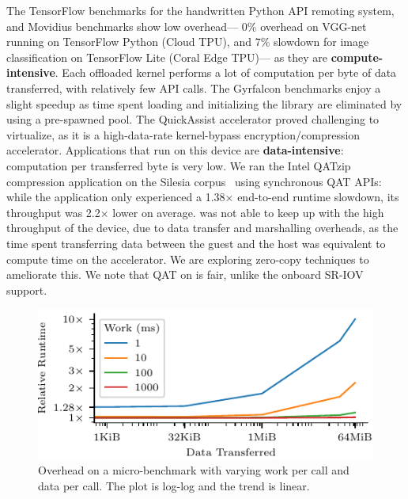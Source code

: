 The TensorFlow benchmarks for the handwritten Python API remoting system, and Movidius benchmarks show low overhead---%
0\% overhead on VGG-net running on TensorFlow Python (Cloud TPU), and 7\% slowdown for image classification on TensorFlow Lite (Coral Edge TPU)---%
as they are \textbf{compute-intensive}. Each offloaded kernel performs a lot of computation per byte of data transferred, with relatively few API calls.
The Gyrfalcon benchmarks enjoy a slight speedup as time spent loading and initializing the library are eliminated by using a pre-spawned \worker pool.
The QuickAssist accelerator proved challenging to virtualize, as it is a high-data-rate kernel-bypass encryption/compression accelerator.
Applications that run on this device are \textbf{data-intensive}: computation per transferred byte is very low.
We ran the Intel QATzip compression application on the Silesia corpus~\cite{silesia} using synchronous QAT APIs: while the application only experienced a 1.38$\times$ end-to-end runtime slowdown, its throughput was 2.2$\times$ lower on average.
\model was not able to keep up with the high throughput of the device, due to data transfer and marshalling overheads, as the time spent transferring data between the guest and the host was equivalent to compute time on the accelerator.
We are exploring zero-copy techniques to ameliorate this. We note that QAT on \model is fair, unlike the onboard SR-IOV support.



\label{s:micro_benchmark}

\begin{figure}
  \centering
	\includegraphics[width=\columnwidth]{ava/data/microbenchmark/overhead_plot.pdf}%
    \vspace*{-.5em}
	\caption{Overhead on a micro-benchmark with varying work per call and data per call. The plot is log-log and the trend is linear.
    }
	\label{fig:microbenchmark_overhead}
\end{figure}


